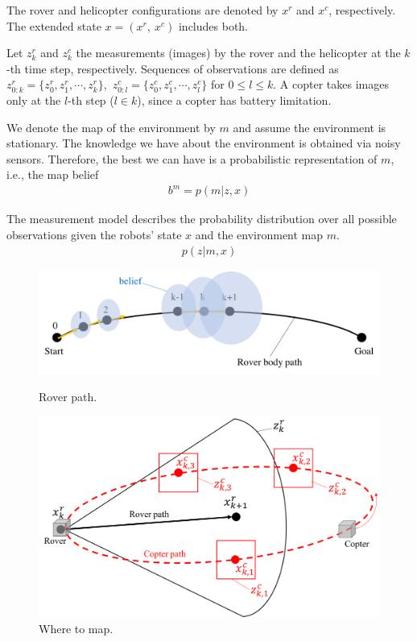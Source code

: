 \documentclass[conference]{IEEEtran}
\begin{document}
The rover and helicopter configurations are denoted by $x^r$ and $x^c$, respectively. The extended state $x=(x^r,~x^c)$ includes both.

Let $z^r_k$ and $z^c_k$ the measurements (images) by the rover and the helicopter at the $k$-th time step, respectively. Sequences of observations are defined as $z^r_{0:k}=\{z^r_0,z^r_1,\cdots,z^r_k\}$,~$z^c_{0:l}=\{z^c_0,z^c_1,\cdots,z^c_l\}$ for $0 \leq l \leq k$. A copter takes images only at the $l$-th step ($l \in k$), since a copter has battery limitation.

We denote the map of the environment by $m$ and assume the environment is stationary. The knowledge we have about the environment is obtained via noisy sensors. Therefore, the best we can have is a probabilistic representation of $m$, i.e., the map belief
\begin{align}
    b^m=p(m|z, x)
\end{align}

The measurement model describes the probability distribution over all possible observations given the robots' state $x$ and the environment map $m$.
\begin{align}
    p(z|m, x)
\end{align}



\begin{figure}[h]
		\centering
		\includegraphics[width=1.0\columnwidth]{figs/8_1.png}
		\caption{Rover path.}
		\label{fig:8_1}
		\centering
		\includegraphics[width=1.0\columnwidth]{figs/8_2.png}
		\caption{Where to map.}
		\label{fig:8_2}
\end{figure}
\end{document}

